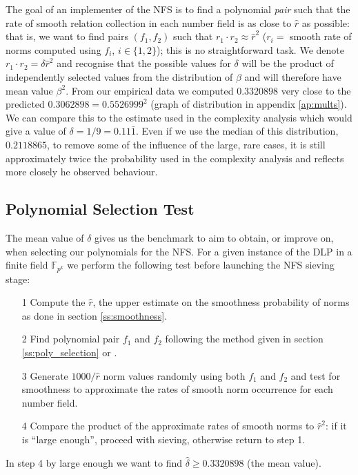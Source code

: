 \documentclass[a4paper, 10pt, envcountsect, runningheads]{lms}
\newcommand{\F}{{\mathbb F}}
\numberwithin{figure}{section}
\numberwithin{equation}{section}
\begin{document}
The goal of an implementer of the NFS is to find a polynomial {\em pair} such that the rate of smooth relation collection in each number field is as close to $\hat{r}$ as possible: that is, we want to find pairs $(f_1,f_2)$ such that $r_1\cdot r_2\approx\hat{r}^2$ ($r_i=$ smooth rate of norms computed using $f_i$, $i\in\{1,2\}$); this is no straightforward task. We denote $r_1\cdot r_2=\delta\hat{r}^2$ and recognise that the possible values for $\delta$ will be the product of independently selected values from the distribution of $\beta$ and will therefore have mean value $\beta^2$. From our empirical data we computed $0.3320898$ very close to the predicted $0.3062898=0.5526999^2$ (graph of distribution in appendix \ref{ap:mults}). We can compare this to the estimate used in the complexity analysis which would give a value of $\delta=1/9=0.11\bar{1}$. Even if we use the median of this distribution, $0.2118865$, to remove some of the influence of the large, rare cases, it is still approximately twice the probability used in the complexity analysis and reflects more closely he observed behaviour.
\newpage
\subsection{Polynomial Selection Test}
\label{ss:poly_test}
The mean value of $\delta$ gives us the benchmark to aim to obtain, or improve on, when selecting our polynomials for the NFS. For a given instance of the DLP in a finite field $\F_{p^k}$ we perform the following test before launching the NFS sieving stage:
\begin{itemize}
\item[1] Compute the $\hat{r}$, the upper estimate on the smoothness probability of norms as done in section \ref{ss:smoothness}.
\item[2] Find polynomial pair $f_1$ and $f_2$ following the method given in section \ref{ss:poly_selection} or \cite{joux-lercier-smart-vercauteren06}.
\item[3] Generate $1000/\hat{r}$ \cite{dan_predicting_nfs} norm values randomly using both $f_1$ and $f_2$ and test for smoothness to approximate the rates of smooth norm occurrence for each number field.
\item[4] Compare the product of the approximate rates of smooth norms to $\hat{r}^2$: if it is ``large enough'', proceed with sieving, otherwise return to step 1.
\end{itemize}
In step 4 by large enough we want to find $\hat{\delta}\geq0.3320898$ (the mean value).
\end{document}
